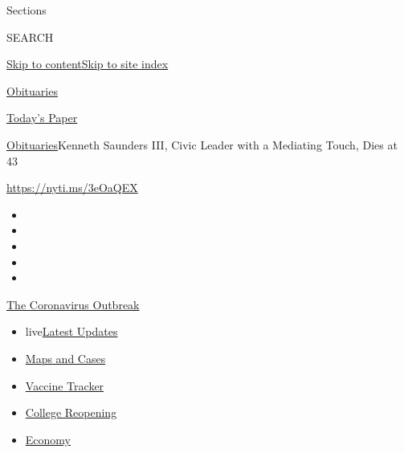 Sections

SEARCH

\protect\hyperlink{site-content}{Skip to
content}\protect\hyperlink{site-index}{Skip to site index}

\href{https://www.nytimes3xbfgragh.onion/section/obituaries}{Obituaries}

\href{https://myaccount.nytimes3xbfgragh.onion/auth/login?response_type=cookie\&client_id=vi}{}

\href{https://www.nytimes3xbfgragh.onion/section/todayspaper}{Today's
Paper}

\href{/section/obituaries}{Obituaries}\textbar{}Kenneth Saunders III,
Civic Leader with a Mediating Touch, Dies at 43

\url{https://nyti.ms/3eOaQEX}

\begin{itemize}
\item
\item
\item
\item
\item
\end{itemize}

\href{https://www.nytimes3xbfgragh.onion/news-event/coronavirus?action=click\&pgtype=Article\&state=default\&region=TOP_BANNER\&context=storylines_menu}{The
Coronavirus Outbreak}

\begin{itemize}
\tightlist
\item
  live\href{https://www.nytimes3xbfgragh.onion/2020/08/04/world/coronavirus-covid-19.html?action=click\&pgtype=Article\&state=default\&region=TOP_BANNER\&context=storylines_menu}{Latest
  Updates}
\item
  \href{https://www.nytimes3xbfgragh.onion/interactive/2020/us/coronavirus-us-cases.html?action=click\&pgtype=Article\&state=default\&region=TOP_BANNER\&context=storylines_menu}{Maps
  and Cases}
\item
  \href{https://www.nytimes3xbfgragh.onion/interactive/2020/science/coronavirus-vaccine-tracker.html?action=click\&pgtype=Article\&state=default\&region=TOP_BANNER\&context=storylines_menu}{Vaccine
  Tracker}
\item
  \href{https://www.nytimes3xbfgragh.onion/2020/08/02/us/covid-college-reopening.html?action=click\&pgtype=Article\&state=default\&region=TOP_BANNER\&context=storylines_menu}{College
  Reopening}
\item
  \href{https://www.nytimes3xbfgragh.onion/live/2020/08/03/business/stock-market-today-coronavirus?action=click\&pgtype=Article\&state=default\&region=TOP_BANNER\&context=storylines_menu}{Economy}
\end{itemize}

